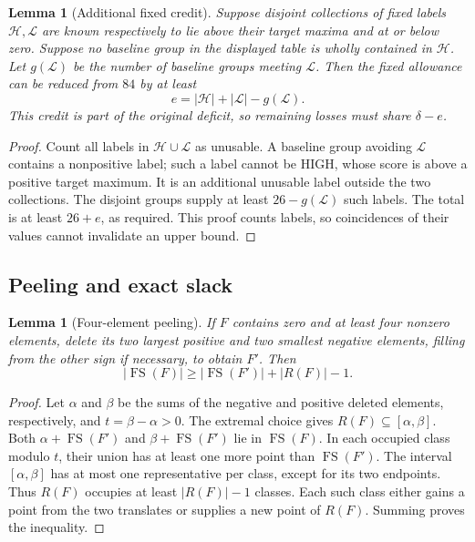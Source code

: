 \documentclass[11pt,letterpaper]{article}
\newcommand{\FS}{\operatorname{FS}}
\newcommand{\card}[1]{\lvert#1\rvert}
\newtheorem{lemma}[theorem]{Lemma}
\theoremstyle{definition}\newtheorem{definition}[theorem]{Definition}
\begin{document}
\begin{lemma}[Additional fixed credit]\label{lem:common-fixed-credit}
Suppose disjoint collections of fixed labels $\mathcal H,\mathcal L$
are known respectively to lie above their target maxima and at or below
zero. Suppose no baseline group in the displayed table is wholly
contained in $\mathcal H$. Let $g(\mathcal L)$ be the number of baseline
groups meeting $\mathcal L$. Then the fixed allowance can be reduced
from $84$ by at least
\[
e=\card{\mathcal H}+\card{\mathcal L}-g(\mathcal L).
\]
This credit is part of the original deficit, so remaining losses must
share $\delta-e$.
\end{lemma}
\begin{proof}
Count all labels in $\mathcal H\cup\mathcal L$ as unusable. A baseline
group avoiding $\mathcal L$ contains a nonpositive label; such a label
cannot be HIGH, whose score is above a positive target maximum.
It is an additional unusable label outside the two collections. The
disjoint groups supply at least $26-g(\mathcal L)$ such labels. The
total is at least $26+e$, as required. This proof counts labels, so
coincidences of their values cannot invalidate an upper bound.
\end{proof}

\subsection{Peeling and exact slack}
\begin{lemma}[Four-element peeling]\label{lem:common-peeling}
If $F$ contains zero and at least four nonzero elements, delete its two
largest positive and two smallest negative elements, filling from the
other sign if necessary, to obtain $F'$. Then
\[
\card{\FS(F)}\ge\card{\FS(F')}+\card{R(F)}-1.
\]
\end{lemma}
\begin{proof}
Let $\alpha$ and $\beta$ be the sums of the negative and positive
deleted elements, respectively, and $t=\beta-\alpha>0$.
The extremal choice gives $R(F)\subseteq[\alpha,\beta]$.
Both $\alpha+\FS(F')$ and $\beta+\FS(F')$ lie in $\FS(F)$.
In each occupied class modulo $t$, their union has at least one more
point than $\FS(F')$. The interval $[\alpha,\beta]$ has at most one
representative per class, except for its two endpoints. Thus $R(F)$
occupies at least $\card{R(F)}-1$ classes. Each such class either gains
a point from the two translates or supplies a new point of $R(F)$.
Summing proves the inequality.
\end{proof}
\end{document}
